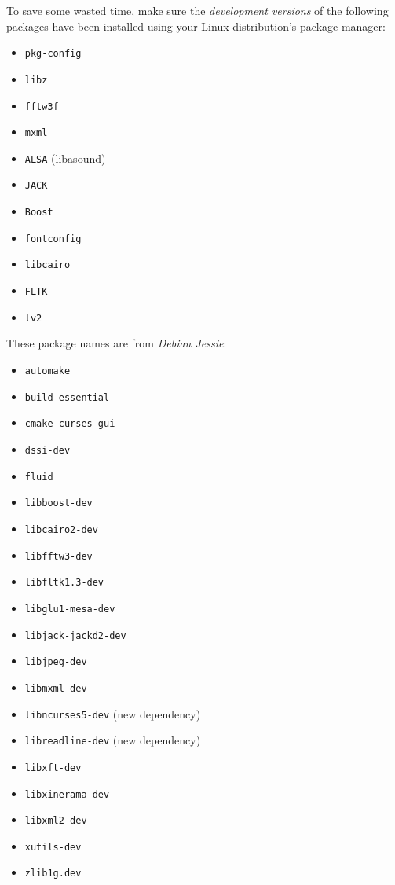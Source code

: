    To save some wasted time, make sure the \textsl{development versions}
   of the following packages have been installed using your Linux
   distribution's package manager:

   \begin{itemize}
      \item \texttt{pkg-config}
      \item \texttt{libz}
      \item \texttt{fftw3f}
      \item \texttt{mxml}
      \item \texttt{ALSA} (libasound)
      \item \texttt{JACK}
      \item \texttt{Boost}
      \item \texttt{fontconfig}
      \item \texttt{libcairo}
      \item \texttt{FLTK}
      \item \texttt{lv2}
   \end{itemize}

   These package names are from \textsl{Debian Jessie}:

   \begin{itemize}
      \item \texttt{automake}
      \item \texttt{build-essential}
      \item \texttt{cmake-curses-gui}
      \item \texttt{dssi-dev}
      \item \texttt{fluid}
      \item \texttt{libboost-dev}
      \item \texttt{libcairo2-dev}
      \item \texttt{libfftw3-dev}
      \item \texttt{libfltk1.3-dev}
      \item \texttt{libglu1-mesa-dev}
      \item \texttt{libjack-jackd2-dev}
      \item \texttt{libjpeg-dev}
      \item \texttt{libmxml-dev}
      \item \texttt{libncurses5-dev} (new dependency)
      \item \texttt{libreadline-dev} (new dependency)
      \item \texttt{libxft-dev}
      \item \texttt{libxinerama-dev}
      \item \texttt{libxml2-dev}
      \item \texttt{xutils-dev}
      \item \texttt{zlib1g.dev}
   \end{itemize}

